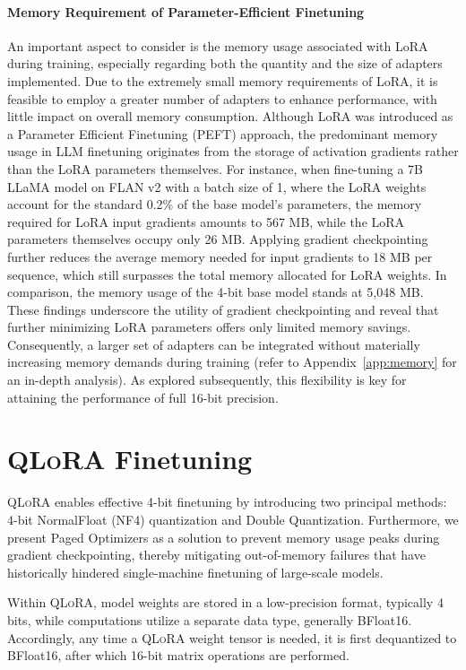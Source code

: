 \paragraph{Memory Requirement of Parameter-Efficient Finetuning} An important aspect to consider is the memory usage associated with LoRA during training, especially regarding both the quantity and the size of adapters implemented. Due to the extremely small memory requirements of LoRA, it is feasible to employ a greater number of adapters to enhance performance, with little impact on overall memory consumption. Although LoRA was introduced as a Parameter Efficient Finetuning (PEFT) approach, the predominant memory usage in LLM finetuning originates from the storage of activation gradients rather than the LoRA parameters themselves. For instance, when fine-tuning a 7B LLaMA model on FLAN v2 with a batch size of 1, where the LoRA weights account for the standard 0.2\% of the base model's parameters\citep{hu2021lora,liu2022few}, the memory required for LoRA input gradients amounts to 567 MB, while the LoRA parameters themselves occupy only 26 MB. Applying gradient checkpointing~\citep{chen2016training} further reduces the average memory needed for input gradients to 18 MB per sequence, which still surpasses the total memory allocated for LoRA weights. In comparison, the memory usage of the 4-bit base model stands at 5,048 MB. These findings underscore the utility of gradient checkpointing and reveal that further minimizing LoRA parameters offers only limited memory savings. Consequently, a larger set of adapters can be integrated without materially increasing memory demands during training (refer to Appendix~\ref{app:memory} for an in-depth analysis). As explored subsequently, this flexibility is key for attaining the performance of full 16-bit precision.

\section{\textsc{QLoRA} Finetuning}

\textsc{QLoRA} enables effective 4-bit finetuning by introducing two principal methods: 4-bit NormalFloat (NF4) quantization and Double Quantization. Furthermore, we present Paged Optimizers as a solution to prevent memory usage peaks during gradient checkpointing, thereby mitigating out-of-memory failures that have historically hindered single-machine finetuning of large-scale models.

Within \textsc{QLoRA}, model weights are stored in a low-precision format, typically 4 bits, while computations utilize a separate data type, generally BFloat16. Accordingly, any time a \textsc{QLoRA} weight tensor is needed, it is first dequantized to BFloat16, after which 16-bit matrix operations are performed.

